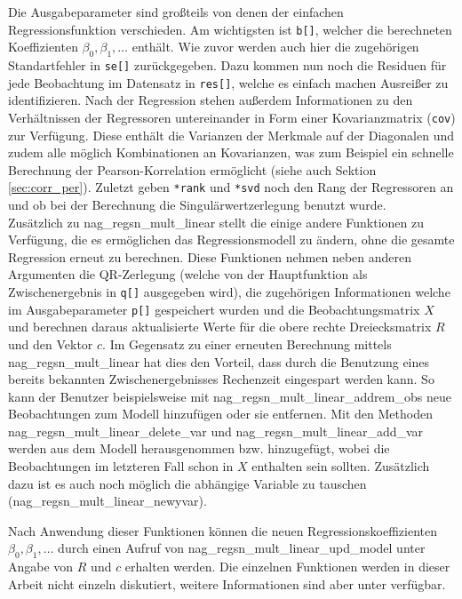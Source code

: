 Die Ausgabeparameter sind großteils von denen der einfachen Regressionsfunktion verschieden.
Am wichtigsten ist \lstinline{b[]}, welcher die berechneten Koeffizienten $\beta_0, \beta_1, \dots$ enthält.
Wie zuvor werden auch hier die zugehörigen Standartfehler in \lstinline{se[]} zurückgegeben.
Dazu kommen nun noch die Residuen für jede Beobachtung im Datensatz in \lstinline{res[]}, welche es einfach machen Ausreißer zu identifizieren.
Nach der Regression stehen außerdem Informationen zu den Verhältnissen der Regressoren untereinander in Form einer Kovarianzmatrix (\lstinline{cov}) zur Verfügung.
Diese enthält die Varianzen der Merkmale auf der Diagonalen und zudem alle möglich Kombinationen an Kovarianzen, was zum Beispiel ein schnelle Berechnung der Pearson-Korrelation ermöglicht (siehe auch Sektion \ref{sec:corr_per}).
Zuletzt geben \lstinline{*rank} und \lstinline{*svd} noch den Rang der Regressoren an und ob bei der Berechnung die Singulärwertzerlegung benutzt wurde.
\\

Zusätzlich zu nag\_regsn\_mult\_linear stellt die \naglib einige andere Funktionen zu Verfügung, die es ermöglichen das Regressionsmodell zu ändern, ohne die gesamte Regression erneut zu berechnen.
Diese Funktionen nehmen neben anderen Argumenten die QR-Zerlegung (welche von der Hauptfunktion als Zwischenergebnis in \lstinline{q[]} ausgegeben wird), die zugehörigen Informationen welche im Ausgabeparameter \lstinline{p[]} gespeichert wurden und die Beobachtungsmatrix $X$ und berechnen daraus aktualisierte Werte für die obere rechte Dreiecksmatrix $R$ und den Vektor $c$.
Im Gegensatz zu einer erneuten Berechnung mittels nag\_regsn\_mult\_linear hat dies den Vorteil, dass durch die Benutzung eines bereits bekannten Zwischenergebnisses Rechenzeit eingespart werden kann.
So kann der Benutzer beispielsweise mit nag\_regsn\_mult\_linear\_addrem\_obs neue Beobachtungen zum Modell hinzufügen oder sie entfernen.
Mit den Methoden nag\_regsn\_mult\_linear\_delete\_var und nag\_regsn\_mult\_linear\_add\_var werden aus dem Modell herausgenommen bzw. hinzugefügt, wobei die Beobachtungen im letzteren Fall schon in $X$ enthalten sein sollten.
Zusätzlich dazu ist es auch noch möglich die abhängige Variable zu tauschen (nag\_regsn\_mult\_linear\_newyvar).

Nach Anwendung dieser Funktionen können die neuen Regressionskoeffizienten $\beta_0, \beta_1, \dots$ durch einen Aufruf von nag\_regsn\_mult\_linear\_upd\_model unter Angabe von $R$ und $c$ erhalten werden.
Die einzelnen Funktionen werden in dieser Arbeit nicht einzeln diskutiert, weitere Informationen sind aber unter \citep{nag:contents} verfügbar.






